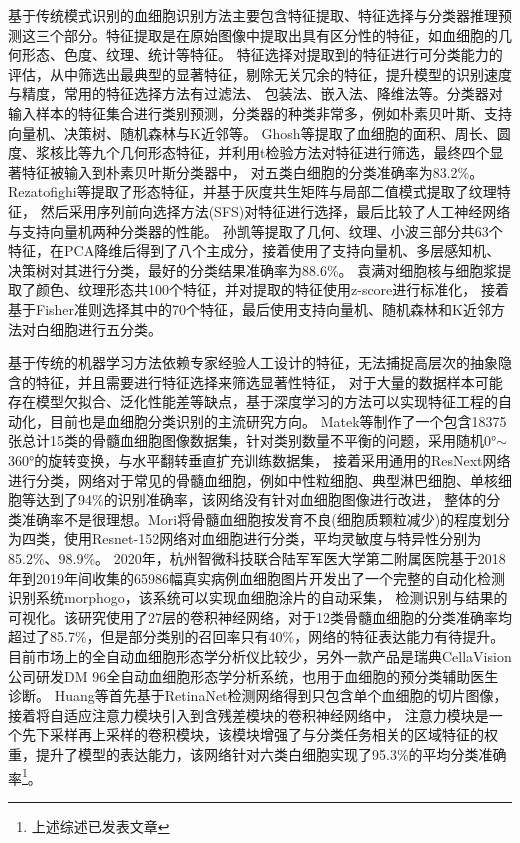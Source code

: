 基于传统模式识别\cite{jain2000statistical}的血细胞识别方法主要包含特征提取、特征选择与分类器推理预测这三个部分。特征提取是在原始图像中提取出具有区分性的特征，如血细胞的几何形态、色度、纹理、统计等特征。
特征选择对提取到的特征进行可分类能力的评估，从中筛选出最典型的显著特征，剔除无关冗余的特征，提升模型的识别速度与精度，常用的特征选择方法有过滤法、
包装法、嵌入法、降维法等。分类器对输入样本的特征集合进行类别预测，分类器的种类非常多，例如朴素贝叶斯、支持向量机、决策树、随机森林与K近邻等。
Ghosh\cite{ghosh2010statistical}等提取了血细胞的面积、周长、圆度、浆核比等九个几何形态特征，并利用t检验方法对特征进行筛选，最终四个显著特征被输入到朴素贝叶斯分类器中，
对五类白细胞的分类准确率为83.2\%。Rezatofighi\cite{2011Automatic}等提取了形态特征，并基于灰度共生矩阵与局部二值模式提取了纹理特征，
然后采用序列前向选择方法(SFS)对特征进行选择，最后比较了人工神经网络与支持向量机两种分类器的性能。
孙凯\cite{sunkai2020}等提取了几何、纹理、小波三部分共63个特征，在PCA降维后得到了八个主成分，接着使用了支持向量机、多层感知机、决策树对其进行分类，最好的分类结果准确率为88.6\%。
袁满\cite{yuan2017}对细胞核与细胞浆提取了颜色、纹理形态共100个特征，并对提取的特征使用z-score进行标准化，
接着基于Fisher准则选择其中的70个特征，最后使用支持向量机、随机森林和K近邻方法对白细胞进行五分类。

基于传统的机器学习方法依赖专家经验人工设计的特征，无法捕捉高层次的抽象隐含的特征，并且需要进行特征选择来筛选显著性特征，
对于大量的数据样本可能存在模型欠拟合、泛化性能差等缺点，基于深度学习的方法可以实现特征工程的自动化，目前也是血细胞分类识别的主流研究方向。
Matek\cite{matek2019human}等制作了一个包含18375张总计15类的骨髓血细胞图像数据集，针对类别数量不平衡的问题，采用随机0°$\sim$360°的旋转变换，与水平翻转垂直扩充训练数据集，
接着采用通用的ResNext网络进行分类，网络对于常见的骨髓血细胞，例如中性粒细胞、典型淋巴细胞、单核细胞等达到了94\%的识别准确率，该网络没有针对血细胞图像进行改进，
整体的分类准确率不是很理想。Mori\cite{mori2020assessment}将骨髓血细胞按发育不良(细胞质颗粒减少)的程度划分为四类，使用Resnet-152网络对血细胞进行分类，平均灵敏度与特异性分别为85.2\%、98.9\%。
2020年，杭州智微科技\cite{fu2020morphogo}联合陆军军医大学第二附属医院基于2018年到2019年间收集的65986幅真实病例血细胞图片开发出了一个完整的自动化检测识别系统morphogo，该系统可以实现血细胞涂片的自动采集，
检测识别与结果的可视化。该研究使用了27层的卷积神经网络，对于12类骨髓血细胞的分类准确率均超过了85.7\%，但是部分类别的召回率只有40\%，网络的特征表达能力有待提升。
目前市场上的全自动血细胞形态学分析仪比较少，另外一款产品是瑞典CellaVision公司研发DM 96\cite{yoon2019diagnostic}全自动血细胞形态学分析系统，也用于血细胞的预分类辅助医生诊断。
Huang\cite{huang2020attention}等首先基于RetinaNet检测网络得到只包含单个血细胞的切片图像，接着将自适应注意力模块引入到含残差模块的卷积神经网络中，
注意力模块是一个先下采样再上采样的卷积模块，该模块增强了与分类任务相关的区域特征的权重，提升了模型的表达能力，该网络针对六类白细胞实现了95.3\%的平均分类准确率\footnote{上述综述已发表文章\cite{SWGC202206005}}。

